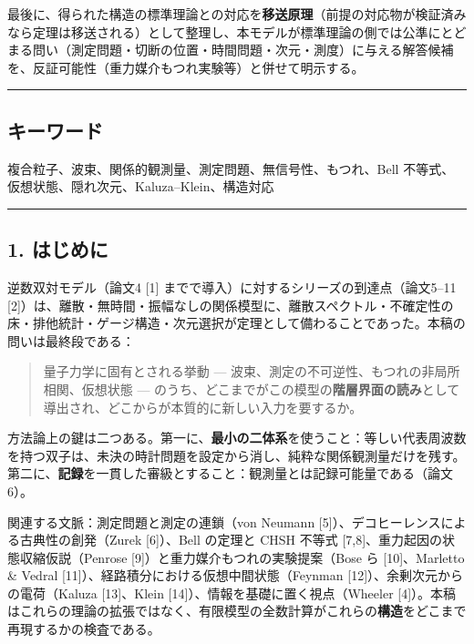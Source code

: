 \documentclass[
]{ltjsarticle}
\begin{document}
最後に、得られた構造の標準理論との対応を\textbf{移送原理}（前提の対応物が検証済みなら定理は移送される）として整理し、本モデルが標準理論の側では公準にとどまる問い（測定問題・切断の位置・時間問題・次元・測度）に与える解答候補を、反証可能性（重力媒介もつれ実験等）と併せて明示する。

\begin{center}\rule{0.5\linewidth}{0.5pt}\end{center}

\subsection{キーワード}\label{ux30adux30fcux30efux30fcux30c9}

複合粒子、波束、関係的観測量、測定問題、無信号性、もつれ、Bell
不等式、仮想状態、隠れ次元、Kaluza--Klein、構造対応

\begin{center}\rule{0.5\linewidth}{0.5pt}\end{center}

\subsection{1. はじめに}\label{ux306fux3058ux3081ux306b}

逆数双対モデル（論文4 {[}1{]}
までで導入）に対するシリーズの到達点（論文5--11
{[}2{]}）は、離散・無時間・振幅なしの関係模型に、離散スペクトル・不確定性の床・排他統計・ゲージ構造・次元選択が定理として備わることであった。本稿の問いは最終段である：

\begin{quote}
量子力学に固有とされる挙動 ---
波束、測定の不可逆性、もつれの非局所相関、仮想状態 ---
のうち、どこまでがこの模型の\textbf{階層界面の読み}として導出され、どこからが本質的に新しい入力を要するか。
\end{quote}

方法論上の鍵は二つある。第一に、\textbf{最小の二体系}を使うこと：等しい代表周波数を持つ双子は、未決の時計問題を設定から消し、純粋な関係観測量だけを残す。第二に、\textbf{記録}を一貫した審級とすること：観測量とは記録可能量である（論文6）。

関連する文脈：測定問題と測定の連鎖（von Neumann
{[}5{]}）、デコヒーレンスによる古典性の創発（Zurek {[}6{]}）、Bell
の定理と CHSH 不等式 {[}7,8{]}、重力起因の状態収縮仮説（Penrose
{[}9{]}）と重力媒介もつれの実験提案（Bose ら {[}10{]}、Marletto \&
Vedral {[}11{]}）、経路積分における仮想中間状態（Feynman
{[}12{]}）、余剰次元からの電荷（Kaluza {[}13{]}、Klein
{[}14{]}）、情報を基礎に置く視点（Wheeler
{[}4{]}）。本稿はこれらの理論の拡張ではなく、有限模型の全数計算がこれらの\textbf{構造}をどこまで再現するかの検査である。
\end{document}
